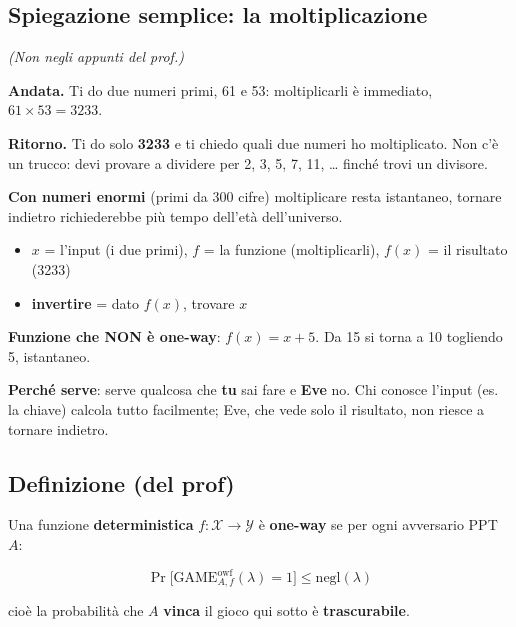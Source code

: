 \subsection{Spiegazione semplice: la moltiplicazione}

\emph{(Non negli appunti del prof.)}

\textbf{Andata.} Ti do due numeri primi, 61 e 53: moltiplicarli è immediato, \(61 \times 53 = 3233\).

\textbf{Ritorno.} Ti do solo \textbf{3233} e ti chiedo quali due numeri ho moltiplicato. Non c'è un trucco: devi provare a dividere per 2, 3, 5, 7, 11, \ldots{} finché trovi un divisore.

\textbf{Con numeri enormi} (primi da 300 cifre) moltiplicare resta istantaneo, tornare indietro richiederebbe più tempo dell'età dell'universo.

\begin{itemize}
\tightlist
\item
  \(x\) = l'input (i due primi), \(f\) = la funzione (moltiplicarli), \(f(x)\) = il risultato (3233)
\item
  \textbf{invertire} = dato \(f(x)\), trovare \(x\)
\end{itemize}

\begin{nota}

\textbf{Funzione che NON è one-way}: \(f(x) = x + 5\). Da 15 si torna a 10 togliendo 5, istantaneo.

\end{nota}

\textbf{Perché serve}: serve qualcosa che \textbf{tu} sai fare e \textbf{Eve} no. Chi conosce l'input (es. la chiave) calcola tutto facilmente; Eve, che vede solo il risultato, non riesce a tornare indietro.

\subsection{Definizione (del prof)}

Una funzione \textbf{deterministica} \(f : \mathcal{X} \to \mathcal{Y}\) è \textbf{one-way} se per ogni avversario PPT \(A\):

\[
\Pr\big[\text{GAME}^{\text{owf}}_{A,f}(\lambda) = 1\big] \le \text{negl}(\lambda)
\]

cioè la probabilità che \(A\) \textbf{vinca} il gioco qui sotto è \textbf{trascurabile}.

